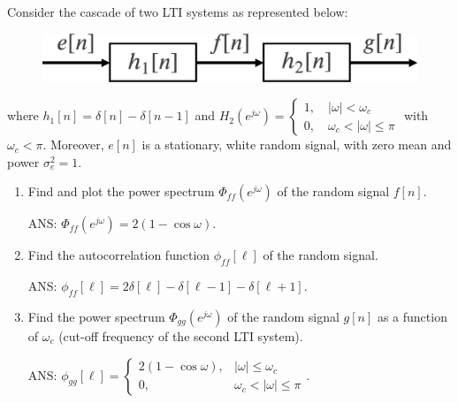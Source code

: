 \begin{q}{}
Consider the cascade of two LTI systems as represented below:
\begin{figure}[H]
    \centering
    \includegraphics[width=.5\textwidth]{images/random_proc_ex.eps}
\end{figure}
where $h_1[n] = \delta[n] - \delta[n-1]$ and $\displaystyle H_2(e^{j\omega}) = \begin{cases}
1, \quad \lvert \omega \rvert < \omega_c \\
0, \quad \omega_c < \lvert \omega \rvert \leq \pi
\end{cases}
$ with $\omega_{c} < \pi$. Moreover, $e[n]$ is a stationary, white random signal, with zero mean and power $\sigma_{e}^2 = 1$.

\begin{enumerate}[label=(\alph*)]
    \item Find and plot the power spectrum $\Phi_{ff}(e^{j\omega})$ of the random signal $f[n]$.

    \begin{flushright}
        \begin{blueenv}
            ANS: $\Phi_{ff}(e^{j\omega}) = 2 (1 - \cos\omega)$.
        \end{blueenv}
    \end{flushright}

    \item Find the autocorrelation function $\phi_{ff}[\ell]$ of the random signal.
    \begin{flushright}
        \begin{blueenv}
            ANS: $\phi_{ff}[\ell] = 2\delta[\ell] - \delta[\ell-1] - \delta[\ell + 1]$.
        \end{blueenv}
    \end{flushright}

    \item Find the power spectrum $\Phi_{gg}(e^{j\omega})$ of the random signal $g[n]$ as a function of $\omega_c$ (cut-off frequency of the second LTI system).
    \begin{flushright}
        \begin{blueenv}
            ANS: $\phi_{gg}[\ell] = 
            \begin{cases}
            2(1-\cos\omega), & \lvert \omega \rvert \leq \omega_c \\
            0, & \omega_c < \lvert \omega \rvert \leq \pi
            \end{cases}$.
        \end{blueenv}
    \end{flushright}


\end{enumerate}
\end{q}

